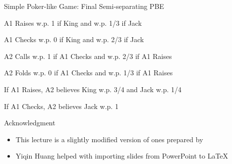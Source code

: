 \documentclass[11pt,aspectratio=169,handout]{beamer}
\begin{document}
  
  \begin{frame}{Simple Poker-like Game: Final Semi-separating PBE}
   \begin{itemizes}
    \item A1 Raises w.p. 1 if King and w.p. 1/3 if Jack
    \item A1 Checks w.p. 0 if King and w.p. 2/3 if Jack
    \item A2 Calls w.p. 1 if A1 Checks and w.p. 2/3 if A1 Raises
    \item A2 Folds w.p. 0 if A1 Checks and w.p. 1/3 if A1 Raises
    \item If A1 Raises, A2 believes King w.p. 3/4 and Jack w.p. 1/4
    \item If A1 Checks, A2 believes Jack w.p. 1
   \end{itemizes}
  \end{frame}
  

  \begin{frame}{Acknowledgment}
   \begin{itemize}
    \setlength{\itemsep}{1em}
    \item This lecture is a slightly modified version of ones prepared by
    \item Yiqin Huang helped with importing slides from PowerPoint to \LaTeX
   \end{itemize}
  \end{frame}
  
  
\end{document}

